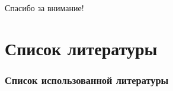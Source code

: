 \documentclass{beamer}
\begin{document}
\begin{frame}{}
\addtocounter{framenumber}{-1}
\begin{center}
\LARGE{Спасибо за внимание!}
\end{center}
\end{frame}

\section{Список литературы}

\begin{frame}[allowframebreaks]
  \frametitle{Список использованной литературы}
  
  
\end{frame}
\end{document}
